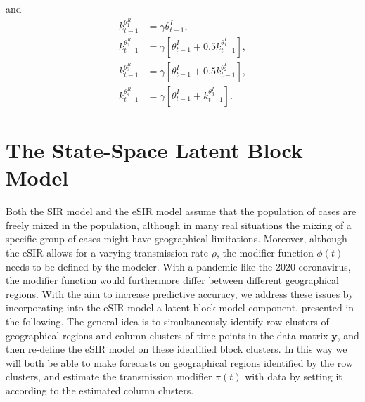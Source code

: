 \documentclass[10pt,a4paper]{article}
\begin{document}
%
and 
%
\begin{equation*}
	\begin{split}	
		k_{t-1}^{\theta^R_1} &= \gamma \theta^I_{t-1}, \\
		k_{t-1}^{\theta^R_2} &= \gamma[\theta_{t-1}^I + 0.5 k_{t-1}^{\theta^I_1}], \\
		k_{t-1}^{\theta^R_3} &= \gamma[\theta_{t-1}^I + 0.5 k_{t-1}^{\theta^I_2}], \\
		k_{t-1}^{\theta^R_4} &= \gamma[\theta_{t-1}^I + k_{t-1}^{\theta^I_3}]. 
	\end{split}
\end{equation*}
%	






\section{The State-Space Latent Block Model}
Both the SIR model and the eSIR model assume that the population of cases are freely mixed in the population, although in many real situations the mixing of a specific group of cases might have geographical limitations. Moreover, although the eSIR allows for a varying transmission rate $\rho$, the modifier function $\phi(t)$ needs to be defined by the modeler. With a pandemic like the 2020 coronavirus, the modifier function would furthermore differ between different geographical regions. With the aim to increase predictive accuracy, we address these issues by incorporating into the eSIR model a latent block model component, presented in the following. The general idea is to simultaneously identify row clusters of geographical regions and column clusters of time points in the data matrix $\mathbf{y}$, and then re-define the eSIR model on these identified block clusters. In this way we will both be able to make forecasts on geographical regions identified by the row clusters, and estimate the transmission modifier $\pi(t)$ with data by setting it according to the estimated column clusters.
 
\end{document}
